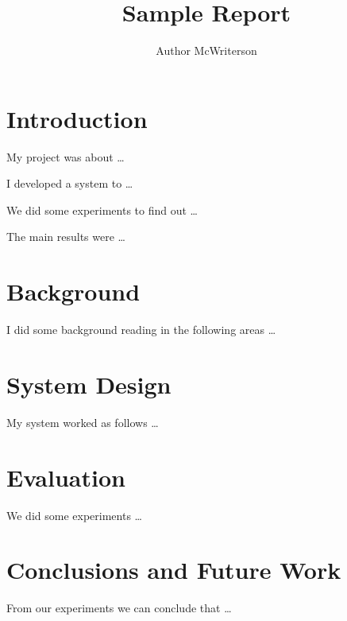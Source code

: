 \documentclass[a4paper, 11pt]{article}
\title{Sample Report}
\author{Author McWriterson}
\begin{document}
\maketitle
\tableofcontents

\section{Introduction}

My project was about \ldots

I developed a system to \ldots

We did some experiments to find out \ldots

The main results were \ldots

\pagebreak

\section{Background}

I did some background reading in the following areas \ldots

\pagebreak

\section{System Design}

My system worked as follows \ldots

\pagebreak

\section{Evaluation}

We did some experiments \ldots

\pagebreak

\section{Conclusions and Future Work}

From our experiments we can conclude that \ldots


\end{document}
